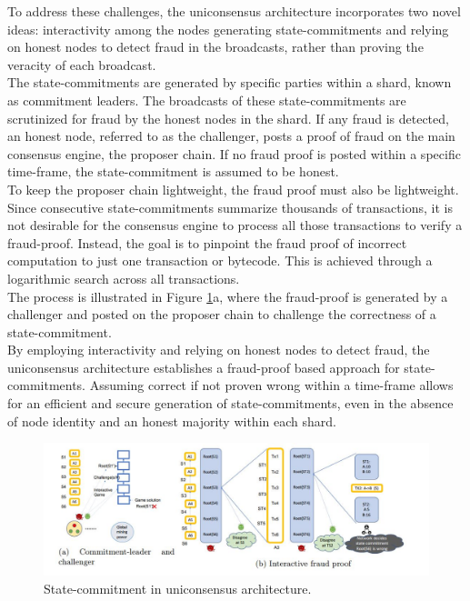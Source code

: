 \documentclass{report}
\begin{document}
\begin{enumerate}
	To address these challenges, the uniconsensus architecture incorporates two novel ideas: interactivity among the nodes generating state-commitments and relying on honest nodes to detect fraud in the broadcasts, rather than proving the veracity of each broadcast.\\
	The state-commitments are generated by specific parties within a shard, known as commitment leaders. The broadcasts of these state-commitments are scrutinized for fraud by the honest nodes in the shard. If any fraud is detected, an honest node, referred to as the challenger, posts a proof of fraud on the main consensus engine, the proposer chain. If no fraud proof is posted within a specific time-frame, the state-commitment is assumed to be honest.\\
	To keep the proposer chain lightweight, the fraud proof must also be lightweight. Since consecutive state-commitments summarize thousands of transactions, it is not desirable for the consensus engine to process all those transactions to verify a fraud-proof. Instead, the goal is to pinpoint the fraud proof of incorrect computation to just one transaction or bytecode. This is achieved through a logarithmic search across all transactions.\\
	The process is illustrated in Figure \ref{fig:f5}a, where the fraud-proof is generated by a challenger and posted on the proposer chain to challenge the correctness of a state-commitment.\\
	By employing interactivity and relying on honest nodes to detect fraud, the uniconsensus architecture establishes a fraud-proof based approach for state-commitments. Assuming correct if not proven wrong within a time-frame allows for an efficient and secure generation of state-commitments, even in the absence of node identity and an honest majority within each shard.
	\begin{center}
		\begin{figure}
			\centering
			\includegraphics[width=0.8\linewidth]{Fig/F5}
			\caption{State-commitment in uniconsensus architecture.}
			\label{fig:f5}
		\end{figure}
	\end{center}

\end{enumerate}
\end{document}
